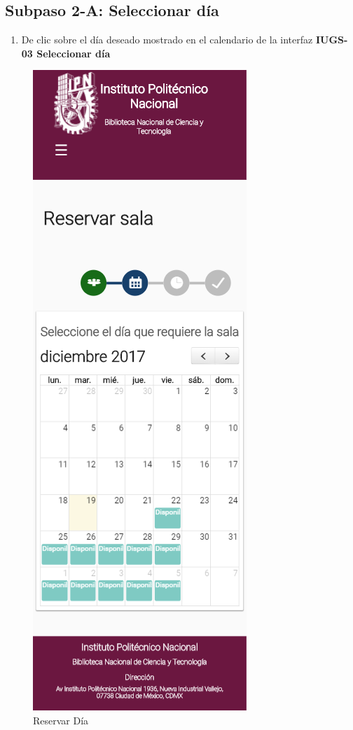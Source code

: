 \subsection{Subpaso 2-A: Seleccionar día}
\begin{enumerate}
	\item De clic sobre el día deseado mostrado en el calendario de la interfaz  \textbf{IUGS-03 Seleccionar día}
	
\end{enumerate}

	\begin{figure}[hbtp]	
		\includegraphics[scale=0.3]{images/InterfazMovil/IUGS02_reservarDiaSolicitante.png}
		\caption{Reservar Día}
	\end{figure}